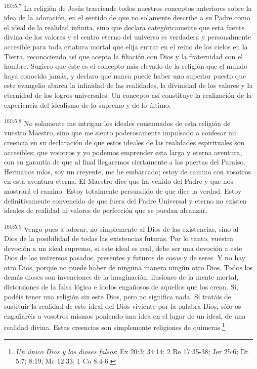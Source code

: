 \par 
\textsuperscript{160:5.7} La religión de Jesús trasciende todos nuestros conceptos anteriores sobre la idea de la adoración, en el sentido de que no solamente describe a su Padre como el ideal de la realidad infinita, sino que declara categóricamente que esta fuente divina de los valores y el centro eterno del universo es verdadera y personalmente accesible para toda criatura mortal que elija entrar en el reino de los cielos en la Tierra, reconociendo así que acepta la filiación con Dios y la fraternidad con el hombre. Sugiero que éste es el concepto más elevado de la religión que el mundo haya conocido jamás, y declaro que nunca puede haber uno superior puesto que este evangelio abarca la infinidad de las realidades, la divinidad de los valores y la eternidad de los logros universales. Un concepto así constituye la realización de la experiencia del idealismo de lo supremo y de lo último.

\par 
\textsuperscript{160:5.8} No solamente me intrigan los ideales consumados de esta religión de vuestro Maestro, sino que me siento poderosamente impulsado a confesar mi creencia en su declaración de que estos ideales de las realidades espirituales son accesibles; que vosotros y yo podemos emprender esta larga y eterna aventura, con su garantía de que al final llegaremos ciertamente a las puertas del Paraíso. Hermanos míos, soy un creyente, me he embarcado; estoy de camino con vosotros en esta aventura eterna. El Maestro dice que ha venido del Padre y que nos mostrará el camino. Estoy totalmente persuadido de que dice la verdad. Estoy definitivamente convencido de que fuera del Padre Universal y eterno no existen ideales de realidad ni valores de perfección que se puedan alcanzar.

\par 
\textsuperscript{160:5.9} Vengo pues a adorar, no simplemente al Dios de las existencias, sino al Dios de la posibilidad de todas las existencias futuras. Por lo tanto, vuestra devoción a un ideal supremo, si este ideal es real, debe ser una devoción a este Dios de los universos pasados, presentes y futuros de cosas y de seres. Y no hay otro Dios, porque no puede haber de ninguna manera ningún otro Dios. Todos los demás dioses son invenciones de la imaginación, ilusiones de la mente mortal, distorsiones de la falsa lógica e ídolos engañosos de aquellos que los crean. Sí, podéis tener una religión sin este Dios, pero no significa nada. Si tratáis de sustituir la realidad de este ideal del Dios viviente por la palabra Dios, sólo os engañaréis a vosotros mismos poniendo una idea en el lugar de un ideal, de una realidad divina. Estas creencias son simplemente religiones de quimeras.\footnote{\textit{Un único Dios y los dioses falsos}: Ex 20:3; 34:14; 2 Re 17:35-38; Jer 25:6; Dt 5:7; 8:19; Mc 12:33; 1 Co 8:4-6.}

